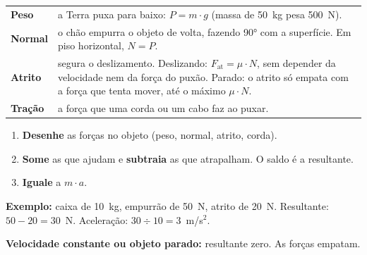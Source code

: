 \begin{minipage}[c]{0.42\linewidth}\centering
{}
\end{minipage}\hfill
\begin{minipage}[c]{0.56\linewidth}\small
\renewcommand{\arraystretch}{1.3}
\begin{tabular}{@{}p{1.45cm}>{\raggedright\arraybackslash}p{7.5cm}@{}}
\textbf{\color{alerta}Peso} & a Terra puxa para baixo: $P = m \cdot g$ (massa de 50~kg pesa 500~N).\\
\textbf{\color{corC!80!black}Normal} & o chão empurra o objeto de volta, fazendo 90° com a superfície. Em piso horizontal, $N = P$.\\
\textbf{\color{ouro}Atrito} & segura o deslizamento. Deslizando: $F_{\text{at}} = \mu \cdot N$, sem depender da velocidade nem da força do puxão.
  Parado: o atrito só empata com a força que tenta mover, até o máximo $\mu \cdot N$.\\
\textbf{\color{tema}Tração} & a força que uma corda ou um cabo faz ao puxar.\\
\end{tabular}
\end{minipage}

\begin{macete}
\begin{enumerate}[leftmargin=1.6em,itemsep=1pt,topsep=1pt]
  \item \textbf{Desenhe} as forças no objeto (peso, normal, atrito, corda).
  \item \textbf{Some} as que ajudam e \textbf{subtraia} as que atrapalham. O saldo é a resultante.
  \item \textbf{Iguale} a $m \cdot a$.
\end{enumerate}
\textbf{Exemplo:} caixa de 10~kg, empurrão de 50~N, atrito de 20~N. Resultante: $50 - 20 = 30$~N. Aceleração: $30 \div 10 = 3$~m/s$^2$.\par
\textbf{Velocidade constante ou objeto parado:} resultante zero. As forças empatam.
\end{macete}

